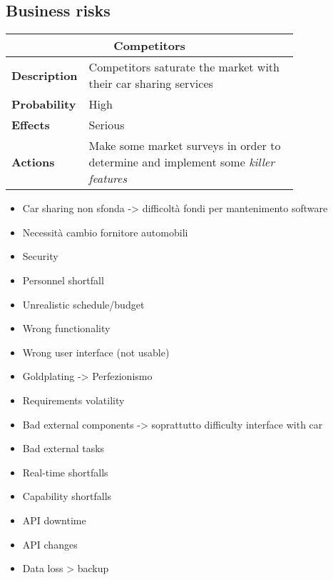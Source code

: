 \subsection{Business risks}
\begin{longtable}{lp{0.8\linewidth}}
\multicolumn{2}{c}{\textbf{Competitors}}\\
\toprule
\textbf{Description}&Competitors saturate the market with their car sharing services\\
\midrule
\textbf{Probability}&High\\
\midrule
\textbf{Effects}&Serious\\
\midrule
\textbf{Actions}&Make some market surveys in order to determine and implement some \emph{killer features}\\
\bottomrule
\end{longtable}

\begin{itemize}

\item Car sharing non sfonda -> difficoltà fondi per mantenimento software
\item Necessità cambio fornitore automobili
\item Security
\item Personnel shortfall
\item Unrealistic schedule/budget
\item Wrong functionality
\item Wrong user interface (not usable)
\item Goldplating -> Perfezionismo
\item Requirements volatility
\item Bad external components -> soprattutto difficulty interface with car
\item Bad external tasks
\item Real-time shortfalls
\item Capability shortfalls
\item API downtime
\item API changes
\item Data loss > backup
\end{itemize}

